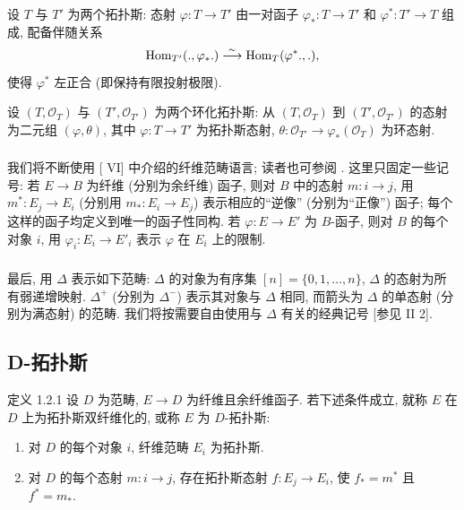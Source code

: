 设 $T$ 与 $T'$ 为两个拓扑斯: 态射 $\varphi : T \to T'$ 由一对函子
$\varphi_{\ast} : T \to T'$ 和 $\varphi^{\ast} : T'\to T$ 组成, 配备伴随关系
$$\operatorname{Hom}_{T'}(.,\varphi_{\ast}.) \overset{\sim}{\longrightarrow}{\operatorname{Hom}}_{T}(\varphi^{\ast} . ,
.),$$
使得 $\varphi^{\ast}$ 左正合 (即保持有限投射极限).

设 $(T, \mathcal{O}_{T})$ 与 $(T', \mathcal{O}_{T'})$ 为两个环化拓扑斯:
从 $(T, \mathcal{O}_{T})$ 到 $(T', \mathcal{O}_{T'})$ 的态射为二元组 $(\varphi, \theta)$,
其中 $\varphi : T \to T'$ 为拓扑斯态射,
$\theta : \mathcal{O}_{T'} \to \varphi_{\ast} (\mathcal{O}_T)$ 为环态射.

\subsubsection{}
我们将不断使用 [ VI] 中介绍的纤维范畴语言; 读者也可参阅 \cite{sga4.exp.Vbis.bib.4}.
这里只固定一些记号: 若 $E \to B$ 为纤维 (分别为余纤维) 函子,
则对 $B$ 中的态射 $m : i \to j$, 用 $m^{\ast} : E_{j} \to E_i$
(分别用 $m_{\ast} : E_i \to E_j$) 表示相应的“逆像”
(分别为\pageoriginale“正像”) 函子;
每个这样的函子均定义到唯一的函子性同构.
若 $\varphi : E \to E'$ 为 $B$-函子, 则对 $B$ 的每个对象 $i$,
用 $\varphi_i : E_i \to E'_i$ 表示 $\varphi$ 在 $E_i$ 上的限制.

\subsubsection{}

最后, 用 $\Delta$ 表示如下范畴:
$\Delta$ 的对象为有序集 $[n] = \{ 0, 1, \ldots, n \}$,
$\Delta$ 的态射为所有弱递增映射.
$\Delta^{+}$ (分别为 $\Delta^{-}$) 表示其对象与 $\Delta$ 相同,
而箭头为 $\Delta$ 的单态射 (分别为满态射) 的范畴.
我们将按需要自由使用与 $\Delta$ 有关的经典记号 [参见 \cite{sga4.exp.Vbis.bib.3} II 2].

\subsection{D-拓扑斯}

\begin{enonce*}{定义 1.2.1}
设 $D$ 为范畴, $E \to D$ 为纤维且余纤维函子.
若下述条件成立, 就称 $E$ 在 $D$ 上为拓扑斯双纤维化的,
或称 $E$ 为 $D$-拓扑斯:
\begin{enumerate}
\renewcommand{\theenumi}{\alph{enumi}}
\renewcommand{\labelenumi}{(\theenumi)}
\item 对 $D$ 的每个对象 $i$, 纤维范畴 $E_i$ 为拓扑斯.

\item 对 $D$ 的每个态射 $m : i \to j$, 存在拓扑斯态射 $f : E_j \to E_i$,
使 $f_{\ast} = m^{\ast}$ 且 $f^{\ast} = m_{\ast}$.
\end{enumerate}
\end{enonce*}


